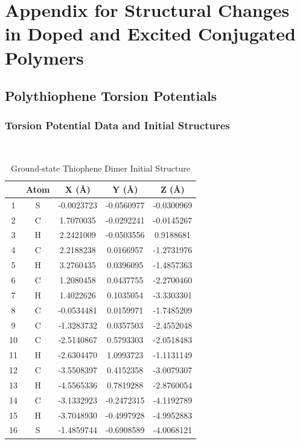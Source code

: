 \chapter{Appendix for Structural Changes in Doped and Excited Conjugated Polymers}

\section{Polythiophene Torsion Potentials}
\label{sec:pt_tp}
\subsection{Torsion Potential Data and Initial Structures}
\
\\[1.5in]
\begin{table}[hbt!]\centering
\caption{Ground-state Thiophene Dimer Initial Structure}
\renewcommand{\arraystretch}{1.5}
\begin{threeparttable}
\begin{tabular}{ccccc}\toprule
{} & {Atom} & {X (\AA)} & {Y (\AA)} & {Z (\AA)} \\ \midrule
  1 & S & -0.0023723 & -0.0560977 & -0.0300969\\
  2 & C & 1.7070035 & -0.0292241 & -0.0145267\\
  3 & H & 2.2421009 & -0.0503556 & 0.9188681\\
  4 & C & 2.2188238 & 0.0166957 & -1.2731976\\ \midrule
  5 & H & 3.2760435 & 0.0396095 & -1.4857363\\
  6 & C & 1.2080458 & 0.0437755 & -2.2700460\\
  7 & H & 1.4022626 & 0.1035054 & -3.3303301\\
  8 & C & -0.0534481 & 0.0159971 & -1.7485209\\ \midrule
  9 & C & -1.3283732 & 0.0357503 & -2.4552048\\
  10 & C & -2.5140867 & 0.5793303 & -2.0518483\\
  11 & H & -2.6304470 & 1.0993723 & -1.1131149\\
  12 & C & -3.5508397 & 0.4152358 & -3.0079307\\ \midrule
  13 & H & -4.5565336 & 0.7819288 & -2.8760054\\
  14 & C & -3.1332923 & -0.2472315 & -4.1192789\\
  15 & H & -3.7048930 & -0.4997928 & -4.9952883\\
  16 & S & -1.4859744 & -0.6908589 & -4.0068121\\ \bottomrule
\end{tabular}
\begin{tablenotes}
\item
\end{tablenotes}
\end{threeparttable}
\end{table}

